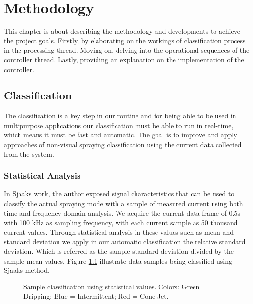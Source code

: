 \chapter{Methodology}
\label{chap:Methodology}

This chapter is about describing the methodology and developments to achieve the project goals. 
Firstly, by elaborating on the workings of classification process in the processing thread. Moving on, delving into the operational sequences of the controller thread. Lastly, providing an explanation on the implementation of the controller.


\section{Classification}
\label{sec:section_classification}

The classification is a key step in our routine and for being able to be used in multipurpose applications our classification must be able to run in real-time, which means it must be fast and automatic.
The goal is to improve and apply approaches of non-visual spraying classification using the current data collected from the system.

\subsection{Statistical Analysis}
In Sjaaks\cite{Sjaaks} work, the author exposed signal characteristics that can be used to classify the actual spraying mode with a sample of measured current using both time and frequency domain analysis.
We acquire the current data frame of 0.5s with 100 kHz as sampling frequency, with each current sample as 50 thousand current values. Through statistical analysis in these values such as mean and standard deviation we apply in our automatic classification the relative standard deviation. Which is referred as the sample standard deviation divided by the sample mean values. 
Figure \ref{fig:sjaaks_statistical_class} illustrate data samples being classified using Sjaaks method.

\begin{figure}[H]
    \centering
    \caption{Sample classification using statistical values. Colors: Green = Dripping; Blue = Intermittent; Red = Cone Jet.}
    \label{fig:sjaaks_statistical_class}
\end{figure}

